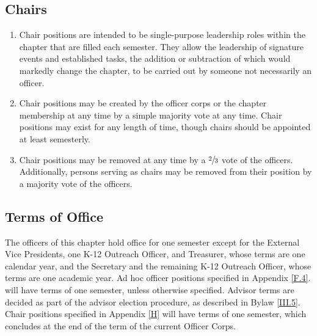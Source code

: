 \subsection{Chairs} \label{I.6}

\begin{enumerate}
    \item {}
    Chair positions are intended to be single-purpose leadership roles within
the chapter that are filled each semester. They allow the leadership of signature
events and established tasks, the addition or subtraction of which would markedly
change the chapter, to be carried out by someone not necessarily an officer.
    \item {}
    Chair positions may be created by the officer corps or the chapter membership
at any time by a simple majority vote at any time. Chair positions may exist
for any length of time, though chairs should be appointed at least semesterly.
    \item {}
    Chair positions may be removed at any time by a $\sfrac{2}{3}$
vote of the officers. Additionally, persons serving as chairs may be removed from
their position by a majority vote of the officers.
\end{enumerate}


\subsection{Terms of Office} \label{I.7}

The officers of this chapter hold office for one semester
except for the External Vice Presidents, one K-12 Outreach Officer, and Treasurer, whose terms are one calendar year, and the Secretary and
the remaining K-12 Outreach Officer, whose terms are one academic year. Ad hoc officer
positions specified in Appendix \ref{F.4}. will have terms of one semester, unless otherwise
specified. Advisor terms are decided as part of the advisor election procedure, as described
in Bylaw \ref{III.5}. Chair positions specified in Appendix \ref{H} will have terms of one semester,
which concludes at the end of the term of the current Officer Corps.